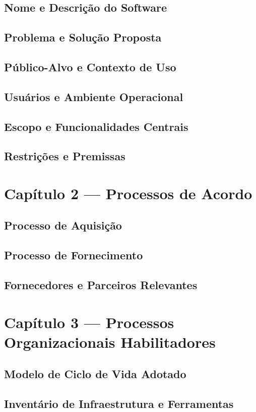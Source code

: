 \documentclass[12pt,a4paper]{article}
\begin{document}
\subsection{Nome e Descrição do Software}
\subsection{Problema e Solução Proposta}
\subsection{Público-Alvo e Contexto de Uso}
\subsection{Usuários e Ambiente Operacional}
\subsection{Escopo e Funcionalidades Centrais}
\subsection{Restrições e Premissas}

\section{Capítulo 2 --- Processos de Acordo}
\subsection{Processo de Aquisição}
\subsection{Processo de Fornecimento}
\subsection{Fornecedores e Parceiros Relevantes}

\section{Capítulo 3 --- Processos Organizacionais Habilitadores}
\subsection{Modelo de Ciclo de Vida Adotado}
\subsection{Inventário de Infraestrutura e Ferramentas}
\end{document}
